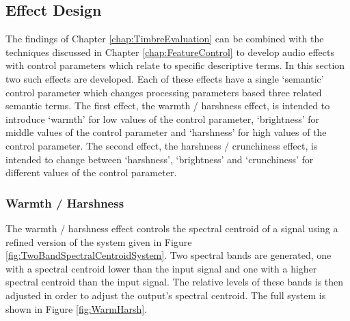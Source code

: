 	\subsection{Effect Design}
	\label{sec:PerceptualExperiments-SemanticControl-EffectDesign}
		The findings of Chapter \ref{chap:TimbreEvaluation} can be combined with the techniques discussed in Chapter
		\ref{chap:FeatureControl} to develop audio effects with control parameters which relate to specific
		descriptive terms. In this section two such effects are developed. Each of these effects have a single
		`semantic' control parameter which changes processing parameters based three related semantic terms. The
		first effect, the warmth / harshness effect, is intended to introduce `warmth' for low values of the control
		parameter, `brightness' for middle values of the control parameter and `harshness' for high values of the
		control parameter. The second effect, the harshness / crunchiness effect, is intended to change between
		`harshness', `brightness' and `crunchiness' for different values of the control parameter.

		\subsubsection*{Warmth / Harshness}
			The warmth / harshness effect controls the spectral centroid of a signal using a refined version of
			the system given in Figure \ref{fig:TwoBandSpectralCentroidSystem}. Two spectral bands are
			generated, one with a spectral centroid lower than the input signal and one with a higher spectral
			centroid than the input signal. The relative levels of these bands is then adjusted in order to
			adjust the output's spectral centroid. The full system is shown in Figure \ref{fig:WarmHarsh}.

